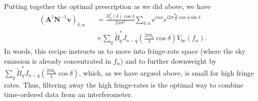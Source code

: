 \documentclass[twocolumn,apj,numberedappendix]{emulateapj}
\newcommand{\vis}{\mathbf{v}}
\newcommand{\A}{\mathbf{A}}
\newcommand{\N}{\mathbf{N}}
\begin{document}
Putting together the optimal prescription as we did above, we have
%
\begin{eqnarray}
\label{eq:AdagNinvv}
\left( \A^\dagger \N^{-1} \vis \right)_{\delta,\alpha} && = \frac{B_\delta^* (\delta)  \cos \delta}{2\pi \sigma^2} \sum_{b,n} e^{i n \alpha} e^{i 2 \pi  \frac{b_y}{\lambda} \cos \eta \sin \delta} \nonumber \\
&& \times \sum_{q} \widetilde{B}_q^* J_{n-q} \left( \frac{2 \pi b_0}{\lambda} \cos \delta \right) \overline{V}_{b\nu} (f_n). \qquad
\end{eqnarray}
In words, this recipe instructs us to move into fringe-rate space (where the
sky emission is already concentrated in $f_n$) and to further downweight by
$\sum_{q} \widetilde{B}_q^* J_{n-q} \left( \frac{2 \pi b_0}{\lambda} \cos \delta \right)$, which, as we have argued above, is small for high fringe
rates.  Thus, filtering away the high fringe-rates is the optimal way to combine
time-ordered data from an interferometer.
\end{document}
